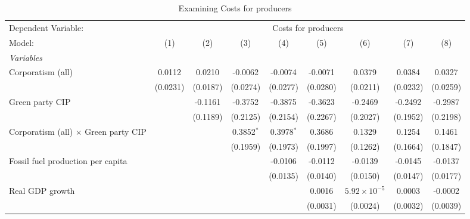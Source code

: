 
\begin{table}[htbp]
   \caption{Examining Costs for producers}
   \centering
   \begin{tabular}{lcccccccc}
      \tabularnewline \midrule \midrule
      Dependent Variable: & \multicolumn{8}{c}{Costs for producers}\\
      Model:                                      & (1)      & (2)      & (3)          & (4)          & (5)      & (6)                   & (7)      & (8)\\  
      \midrule
      \emph{Variables}\\
      Corporatism (all)                           & 0.0112   & 0.0210   & -0.0062      & -0.0074      & -0.0071  & 0.0379                & 0.0384   & 0.0327\\   
                                                  & (0.0231) & (0.0187) & (0.0274)     & (0.0277)     & (0.0280) & (0.0211)              & (0.0232) & (0.0259)\\   
      Green party CIP                             &          & -0.1161  & -0.3752      & -0.3875      & -0.3623  & -0.2469               & -0.2492  & -0.2987\\   
                                                  &          & (0.1189) & (0.2125)     & (0.2154)     & (0.2267) & (0.2027)              & (0.1952) & (0.2198)\\   
      Corporatism (all) $\times$ Green party CIP  &          &          & 0.3852$^{*}$ & 0.3978$^{*}$ & 0.3686   & 0.1329                & 0.1254   & 0.1461\\   
                                                  &          &          & (0.1959)     & (0.1973)     & (0.1997) & (0.1262)              & (0.1664) & (0.1847)\\   
      Fossil fuel production per capita           &          &          &              & -0.0106      & -0.0112  & -0.0139               & -0.0145  & -0.0137\\   
                                                  &          &          &              & (0.0135)     & (0.0140) & (0.0150)              & (0.0147) & (0.0177)\\   
      Real GDP growth                             &          &          &              &              & 0.0016   & $5.92\times 10^{-5}$  & 0.0003   & -0.0002\\   
                                                  &          &          &              &              & (0.0031) & (0.0024)              & (0.0032) & (0.0039)\\   

\end{tabular}
\end{table}
